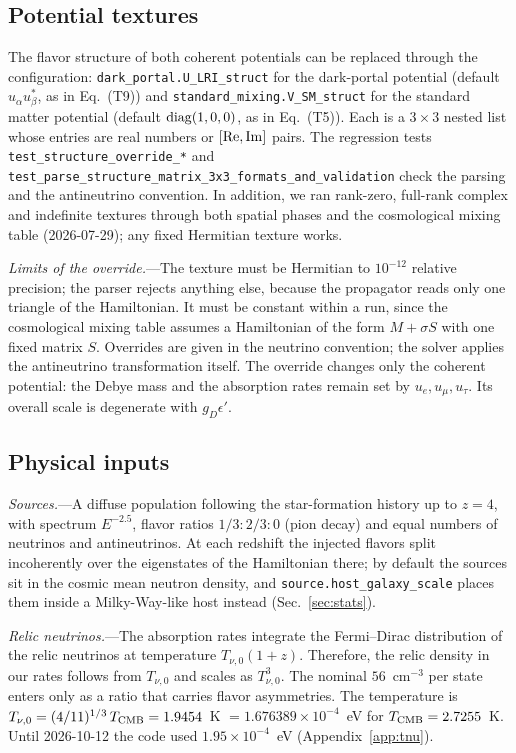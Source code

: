 \documentclass[11pt,a4paper]{article}
\newcommand{\file}[1]{\nolinkurl{#1}}
\newcommand{\gd}{g_D}
\newcommand{\epsp}{\epsilon'}
\newcommand{\Tnu}{T_{\nu,0}}
\begin{document}
\subsection{Potential textures}
\label{sec:textures}

The flavor structure of both coherent potentials can be replaced through the configuration:
\texttt{dark\_portal.U\_LRI\_struct} for the dark-portal potential (default
$u_\alpha u^*_\beta$, as in Eq.~(T9)) and \texttt{standard\_mixing.V\_SM\_struct} for the
standard matter potential (default ${\rm diag}(1,0,0)$, as in Eq.~(T5)). Each is a $3\times3$
nested list whose entries are real numbers or $[{\rm Re}, {\rm Im}]$ pairs. The regression tests
\file{test_structure_override_*} and
\file{test_parse_structure_matrix_3x3_formats_and_validation} check the parsing and the
antineutrino convention. In addition, we ran rank-zero, full-rank complex and indefinite textures
through both spatial phases and the cosmological mixing table (2026-07-29); any fixed Hermitian
texture works.

\textit{Limits of the override.}---The texture must be Hermitian to $10^{-12}$ relative
precision; the parser rejects anything else, because the propagator reads only one triangle
of the Hamiltonian. It must be constant within a run, since the cosmological mixing table
assumes a Hamiltonian of the form $M + \sigma S$ with one fixed matrix $S$. Overrides are given
in the neutrino convention; the solver applies the antineutrino transformation itself. The
override changes only the coherent potential: the Debye mass and the absorption rates remain
set by $u_e, u_\mu, u_\tau$. Its overall scale is degenerate with $\gd\epsp$.

\subsection{Physical inputs}
\label{sec:inputs}

\textit{Sources.}---A diffuse population following the star-formation history up to $z = 4$,
with spectrum $E^{-2.5}$, flavor ratios $1/3:2/3:0$ (pion decay) and equal numbers of neutrinos
and antineutrinos. At each redshift the injected flavors split incoherently over the eigenstates
of the Hamiltonian there; by default the sources sit in the cosmic mean neutron density, and
\texttt{source.host\_galaxy\_scale} places them inside a Milky-Way-like host instead
(Sec.~\ref{sec:stats}).

\textit{Relic neutrinos.}---The absorption rates integrate the Fermi--Dirac distribution of
the relic neutrinos at temperature $\Tnu(1+z)$. Therefore, the relic density in our rates
follows from $\Tnu$ and scales as $\Tnu^3$. The nominal $56$~cm$^{-3}$ per state enters only as
a ratio that carries flavor asymmetries. The temperature is
$\Tnu = (4/11)^{1/3}\,T_{\rm CMB} = 1.9454$~K $= 1.676389\times10^{-4}$~eV for
$T_{\rm CMB}=2.7255$~K. Until 2026-10-12 the code used $1.95\times10^{-4}$~eV
(Appendix~\ref{app:tnu}).
\end{document}
